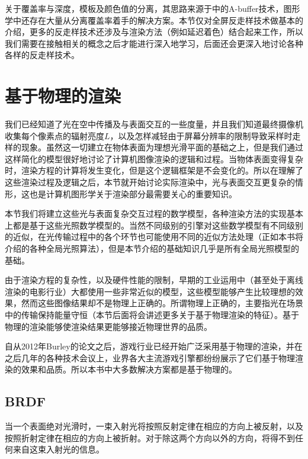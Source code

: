 关于覆盖率与深度，模板及颜色值的分离，其思路来源于\cite{a:TheA-bufferanAntialiasedHiddenSurfaceMethod}中的A-buffer技术，图形学中还存在大量从分离覆盖率着手的解决方案。本节仅对全屏反走样技术做基本的介绍，更多的反走样技术还涉及与渲染方法（例如延迟着色）结合起来工作，所以我们需要在接触相关的概念之后才能进行深入地学习，后面还会更深入地讨论各种各样的反走样技术。





\section{基于物理的渲染}
我们已经知道了光在空中传播及与表面交互的一些度量，并且我们知道最终摄像机收集每个像素点的辐射亮度$L$，以及怎样减轻由于屏幕分辨率的限制导致采样时走样的现象。虽然这一切建立在物体表面为理想光滑平面的基础之上，但是我们通过这样简化的模型很好地讨论了计算机图像渲染的逻辑和过程。当物体表面变得复杂时，渲染方程的计算将发生变化，但是这个逻辑框架是不会变化的。所以在理解了这些渲染过程及逻辑之后，本节就开始讨论实际渲染中，光与表面交互更复杂的情形，这也是计算机图形学关于渲染部分最需要关心的重要知识。

本节我们将建立这些光与表面复杂交互过程的数学模型，各种渲染方法的实现基本上都是基于这些光照数学模型的。当然不同级别的引擎对这些数学模型有不同级别的近似，在光传输过程中的各个环节也可能使用不同的近似方法处理（正如本书将介绍的各种全局光照算法），但是本节介绍的基础知识几乎是所有全局光照模型的基础。

由于渲染方程的复杂性，以及硬件性能的限制，早期的工业运用中（甚至处于离线渲染的电影行业）大都使用一些非常近似的模型，这些模型能够产生比较理想的效果，然而这些图像结果却不是物理上正确的。所谓物理上正确的，主要指光在场景中的传输保持能量守恒（本节后面将会讲述更多关于基于物理渲染的特征）。基于物理的渲染能够使渲染结果更能够接近物理世界的品质。

自从2012年Burley的论文\cite{a:PhysicallyBasedShadingatDisney}之后，游戏行业已经开始广泛采用基于物理的渲染，并在之后几年的各种技术会议上，业界各大主流游戏引擎都纷纷展示了它们基于物理渲染的效果和品质。所以本书中大多数解决方案都是基于物理的。



\subsection{BRDF}\label{sec:intro-BRDF}
当一个表面绝对光滑时，一束入射光将按照反射定律在相应的方向上被反射，以及按照折射定律在相应的方向上被折射。对于除这两个方向以外的方向，将得不到任何来自这束入射光的信息。


